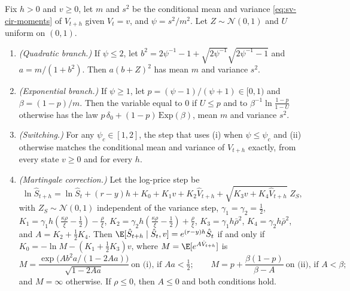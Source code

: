 \begin{proposition}\label{prop:sv-qe}
Fix $h>0$ and $v\ge0$, let $m$ and $s^2$ be the conditional mean and variance \eqref{eq:sv-cir-moments} of
$V_{t+h}$ given $V_t=v$, and $\psi=s^2/m^2$. Let $Z\sim\mathcal N(0,1)$ and $U$ uniform on $(0,1)$.
\begin{enumerate}[label=(\roman*)]
  \item \emph{(Quadratic branch.)} If $\psi\le2$, let $b^2=2\psi^{-1}-1+\sqrt{2\psi^{-1}}\sqrt{2\psi^{-1}-1}$ and
    $a=m/(1+b^2)$. Then $a(b+Z)^2$ has mean $m$ and variance $s^2$.
  \item \emph{(Exponential branch.)} If $\psi\ge1$, let $p=(\psi-1)/(\psi+1)\in[0,1)$ and $\beta=(1-p)/m$. Then the
    variable equal to $0$ if $U\le p$ and to $\beta^{-1}\ln\frac{1-p}{1-U}$ otherwise has the law
    $p\,\delta_0+(1-p)\,\mathrm{Exp}(\beta)$, mean $m$ and variance $s^2$.
  \item \emph{(Switching.)} For any $\psi_c\in[1,2]$, the step that uses (i) when $\psi\le\psi_c$ and (ii) otherwise
    matches the conditional mean and variance of $V_{t+h}$ exactly, from every state $v\ge0$ and for every $h$.
  \item \emph{(Martingale correction.)} Let the log-price step be
    \[
      \ln\hat S_{t+h}=\ln\hat S_t+(r-y)h+K_0+K_1v+K_2\hat V_{t+h}+\sqrt{K_3v+K_4\hat V_{t+h}}\;Z_S,
    \]
    with $Z_S\sim\mathcal N(0,1)$ independent of the variance step, $\gamma_1=\gamma_2=\frac12$,
    $K_1=\gamma_1h(\frac{\kappa\rho}\xi-\frac12)-\frac\rho\xi$, $K_2=\gamma_2h(\frac{\kappa\rho}\xi-\frac12)+\frac\rho\xi$,
    $K_3=\gamma_1h\bar\rho^2$, $K_4=\gamma_2h\bar\rho^2$, and $A=K_2+\frac12K_4$. Then
    $\E[\hat S_{t+h}\mid\hat S_t,v]=e^{(r-y)h}\hat S_t$ if and only if $K_0=-\ln M-(K_1+\frac12K_3)v$, where
    $M=\E[e^{A\hat V_{t+h}}]$ is
    \[
      M=\frac{\exp\big(Ab^2a/(1-2Aa)\big)}{\sqrt{1-2Aa}}\ \text{on (i), if }Aa<\tfrac12;\qquad
      M=p+\frac{\beta(1-p)}{\beta-A}\ \text{on (ii), if }A<\beta;
    \]
    and $M=\infty$ otherwise. If $\rho\le0$, then $A\le0$ and both conditions hold.
\end{enumerate}
\end{proposition}

